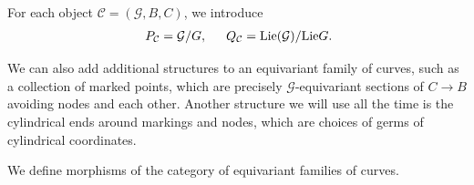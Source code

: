 \documentclass[reqno, 10pt]{amsart}
\numberwithin{equation}{section}
\numberwithin{equation}{section}
\theoremstyle{definition}
\theoremstyle{remark}
\newcommand{\mc}{\mathcal}
\begin{document}
For each object ${\mc C} = ({\mc G}, B, C)$, we introduce
\begin{align*}
&\ P_{\mc C} = {\mc G}/G,\ &\ Q_{\mc C} = {\rm Lie}({\mc G})/ {\rm Lie} G.
\end{align*}





We can also add additional structures to an equivariant family of curves, such as a collection of marked points, which are precisely ${\mc G}$-equivariant sections of $C \to B$ avoiding nodes and each other. Another structure we will use all the time is the cylindrical ends around markings and nodes, which are choices of germs of cylindrical coordinates. 

We define morphisms of the category of equivariant families of curves. 
\end{document}
